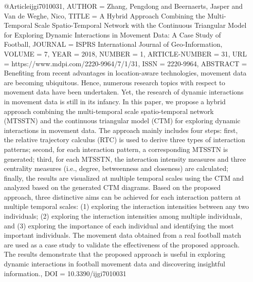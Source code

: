 
@Article{ijgi7010031,
AUTHOR = {Zhang, Pengdong and Beernaerts, Jasper and Van de Weghe, Nico},
TITLE = {A Hybrid Approach Combining the Multi-Temporal Scale Spatio-Temporal Network with the Continuous Triangular Model for Exploring Dynamic Interactions in Movement Data: A Case Study of Football},
JOURNAL = {ISPRS International Journal of Geo-Information},
VOLUME = {7},
YEAR = {2018},
NUMBER = {1},
ARTICLE-NUMBER = {31},
URL = {https://www.mdpi.com/2220-9964/7/1/31},
ISSN = {2220-9964},
ABSTRACT = {Benefiting from recent advantages in location-aware technologies, movement data are becoming ubiquitous. Hence, numerous research topics with respect to movement data have been undertaken. Yet, the research of dynamic interactions in movement data is still in its infancy. In this paper, we propose a hybrid approach combining the multi-temporal scale spatio-temporal network (MTSSTN) and the continuous triangular model (CTM) for exploring dynamic interactions in movement data. The approach mainly includes four steps: first, the relative trajectory calculus (RTC) is used to derive three types of interaction patterns; second, for each interaction pattern, a corresponding MTSSTN is generated; third, for each MTSSTN, the interaction intensity measures and three centrality measures (i.e., degree, betweenness and closeness) are calculated; finally, the results are visualized at multiple temporal scales using the CTM and analyzed based on the generated CTM diagrams. Based on the proposed approach, three distinctive aims can be achieved for each interaction pattern at multiple temporal scales: (1) exploring the interaction intensities between any two individuals; (2) exploring the interaction intensities among multiple individuals, and (3) exploring the importance of each individual and identifying the most important individuals. The movement data obtained from a real football match are used as a case study to validate the effectiveness of the proposed approach. The results demonstrate that the proposed approach is useful in exploring dynamic interactions in football movement data and discovering insightful information.},
DOI = {10.3390/ijgi7010031}
}



